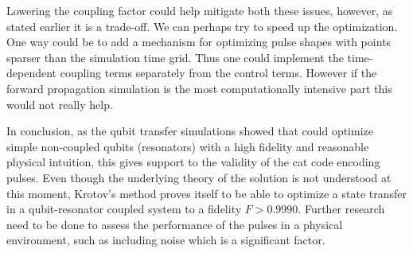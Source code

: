 \documentclass[main.tex]{subfiles}
\begin{document}
Lowering the coupling factor could help mitigate both these issues, however, as stated earlier it is a trade-off.
We can perhaps try to speed up the optimization.
One way could be to add a mechanism for optimizing pulse shapes with points sparser than the simulation time grid.
Thus one could implement the time-dependent coupling terms separately from the control terms.
However if the forward propagation simulation is the most computationally intensive part this would not really help.

In conclusion, as the qubit transfer simulations showed that \krotov{} could optimize simple non-coupled qubits (resonators) with a high fidelity and reasonable physical intuition, this gives support to the validity of the cat code encoding pulses.
Even though the underlying theory of the solution is not understood at this moment, Krotov's method proves itself to be able to optimize a state transfer in a qubit-resonator coupled system to a fidelity \(F > 0.9990\).
Further research need to be done to assess the performance of the pulses in a physical environment, such as including noise which is a significant factor.
\end{document}
